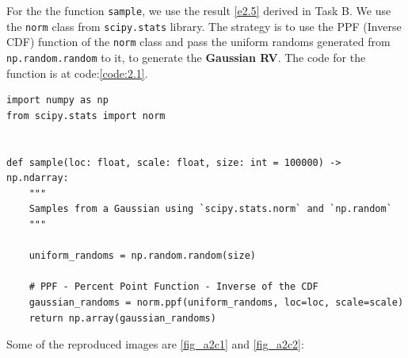 
For the the function \texttt{sample}, we use the result \ref{e2.5} derived in
Task B. We use the \texttt{norm} class from \texttt{scipy.stats} library. The
strategy is to use the PPF (Inverse CDF) function of the \texttt{norm} class and
pass the uniform randoms generated from \texttt{np.random.random} to it, to
generate the \textbf{Gaussian RV}. The code for the function is at
code:\ref{code:2.1}.

\begin{lstlisting}[caption={The function \texttt{sample}}, label={code:2.1}]
import numpy as np
from scipy.stats import norm


def sample(loc: float, scale: float, size: int = 100000) -> np.ndarray:
    """
    Samples from a Gaussian using `scipy.stats.norm` and `np.random`
    """

    uniform_randoms = np.random.random(size)

    # PPF - Percent Point Function - Inverse of the CDF
    gaussian_randoms = norm.ppf(uniform_randoms, loc=loc, scale=scale)
    return np.array(gaussian_randoms)
\end{lstlisting}

Some of the reproduced images are \ref{fig_a2c1} and \ref{fig_a2c2}:

